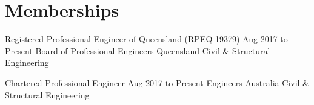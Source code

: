 \section{Memberships}

\entrytable%
{Registered Professional Engineer of Queensland (\href{https://portal.bpeq.qld.gov.au/Shared_Content/ContactManagement/Profile.aspx?ID=27499\&WebsiteKey=a4c65a33-7c41-409b-bb49-caf2106afb3d\&ContactKey=ace3a974-d062-46e9-aa40-f2f068a67184}{RPEQ 19379})}
{Aug 2017 to Present}
{}
{Board of Professional Engineers Queensland}
{Civil \& Structural Engineering}
{\vspace{-3\parskip}}

\entrytable%
{Chartered Professional Engineer}
{Aug 2017 to Present}
{}
{Engineers Australia}
{Civil \& Structural Engineering}
{\vspace{-3\parskip}}
